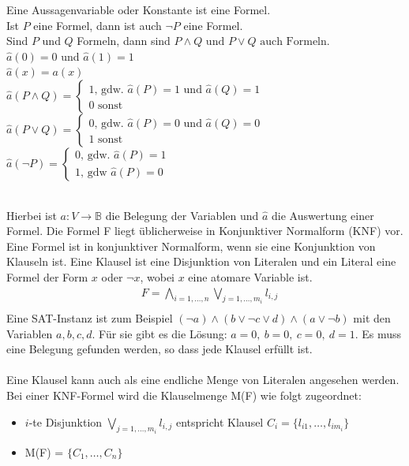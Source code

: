\documentclass[a4,abstract=on]{scrartcl}
\begin{document}
\begin{mdframed} [linecolor=black,linewidth=2pt]
Eine Aussagenvariable oder Konstante ist eine Formel.\\
Ist $P$ eine Formel, dann ist auch  $\neg P$  eine Formel.\\
Sind $P$ und  $Q$  Formeln, dann sind
$P \wedge Q  \text{ und }  P \vee Q \text{ auch Formeln.}$\\
$\hat{a}(0)=0$ und $\hat{a}(1)=1$\\
$\hat{a}(x)=a(x)$\\
$\hat{a}(P\wedge Q) = \begin{cases}1 \text{, gdw. } \hat{a}(P) = 1 \text{ und } \hat{a}(Q)=1\\ 0 \text{ sonst}\end{cases}$\\
$\hat{a}(P\vee Q) = \begin{cases}0 \text{, gdw. } \hat{a}(P) = 0 \text{ und } \hat{a}(Q)=0\\ 1 \text{ sonst}\end{cases}$\\
$\hat{a}(\neg P) = \begin{cases}0 \text{, gdw. } \hat{a}(P) = 1 \\ 1 \text{, gdw } \hat{a}(P) = 0\end{cases}$
\end{mdframed}
\ \\
Hierbei ist $a:V\rightarrow \mathbb{B}$ die Belegung der Variablen und $\hat{a}$ die Auswertung einer Formel.
Die Formel F liegt üblicherweise in Konjunktiver Normalform (KNF) vor. Eine Formel ist in konjunktiver Normalform, wenn sie eine Konjunktion von Klauseln ist. Eine Klausel ist eine Disjunktion von Literalen und ein Literal eine Formel der Form $x$ oder $\neg x$, wobei $x$ eine atomare Variable ist.\\
\begin{align*}
&F = \bigwedge_{i=1, \dots ,n} \bigvee_{j=1,\dots ,m_i}{l_{i,j}}\\
\end{align*}
Eine SAT-Instanz ist zum Beispiel $(\neg a) \wedge (b \vee \neg c \vee d) \wedge (a \vee \neg b)$ mit den Variablen $a,b,c,d$. Für sie gibt es die Lösung: $a = 0,{~} b = 0,{~} c= 0, {~} d = 1$. Es muss eine Belegung gefunden werden, so dass jede Klausel erfüllt ist.\\
\ \\
Eine Klausel kann auch als eine endliche Menge von Literalen angesehen werden. Bei einer KNF-Formel wird die Klauselmenge M(F) wie folgt zugeordnet:\\
\begin{itemize}
\item $i$-te Disjunktion $\bigvee_{j=1,\dots ,m_i}{l_{i,j}}$ entspricht Klausel $C_i = \{l_{i1}, \dots, l_{im_i}\}$
\item M(F) = $\{C_1, \dots, C_n\}$
\end{itemize}
\end{document}
